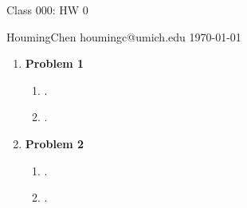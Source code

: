 \documentclass[a4paper,10pt]{article}
\begin{document}
	
	\begin{center}
		{\Huge Class 000: HW 0}
		
		\vspace{.1in}
		
		HoumingChen houmingc@umich.edu \today
	\end{center}

\begin{enumerate}
	\item \textbf{\large{Problem 1}}
	
	
	\begin{enumerate} [label=(\roman*)]
		\item .
		\item .
		
	\end{enumerate}
	
	
	
	\newpage
	\item \textbf{\large{Problem 2}}
	
	\begin{enumerate} [label=(\roman*)]
		\item .
		\item .
		
	\end{enumerate}
	
	
	
	
\end{enumerate}
\end{document}
